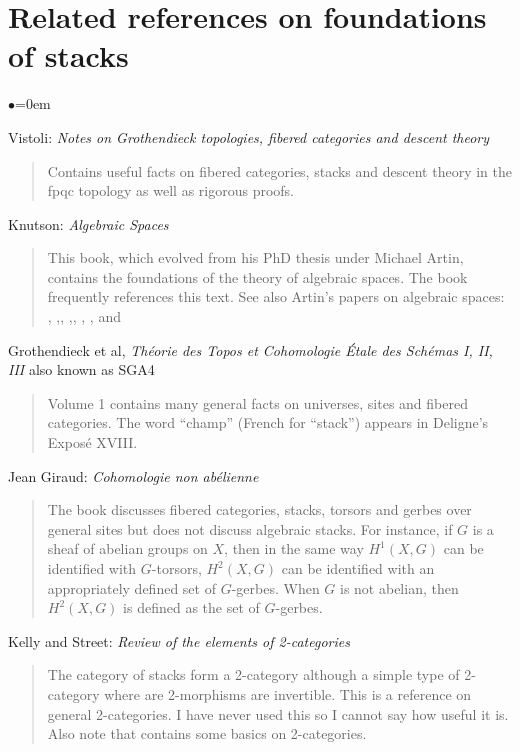 \section{Related references on foundations of stacks}
\label{section-related}


\begin{list}{$\bullet$}{\leftmargin=0em}
\item
Vistoli:
\emph{Notes on Grothendieck topologies, fibered categories and descent theory}
\cite{vistoli_fga}
\begin{quote}
Contains useful facts on fibered categories, stacks and descent theory in the 
fpqc topology as well as rigorous proofs.
\end{quote}
\smallskip
\item{} Knutson: \emph{Algebraic Spaces} \cite{knutson}
\begin{quote}
This book, which evolved from his PhD thesis under Michael Artin, 
contains the foundations of the theory of algebraic spaces. The book 
\cite{lmb} frequently references this text. See also Artin's papers on 
algebraic spaces: \cite{artin_approximation}, 
\cite{artin_algebraizationI},\cite{artin_implicit}, 
\cite{artin_algebraizationII},\cite{artin_construction}, 
\cite{artin_algebraic_spaces}, \cite{artin_theorems}, and \cite{artin_versal}
\end{quote}
\smallskip
\item Grothendieck et al, \emph{Th\'eorie des Topos et Cohomologie \'Etale des 
Sch\'emas I, II, III} also known as SGA4 \cite{SGA4} 
\begin{quote}
Volume 1 contains many general facts on universes, sites and fibered 
categories. The word ``champ'' (French for ``stack'') appears in 
Deligne's Expos\'e XVIII.
\end{quote}
\smallskip
\item{} Jean Giraud: \emph{Cohomologie non ab\'elienne} \cite{giraud}
\begin{quote}
The book discusses fibered categories, stacks, torsors and gerbes over general 
sites but does not discuss algebraic stacks. For instance, if $G$ is a sheaf 
of abelian groups on $X$, then in the same way $H^1(X,G)$ can be identified 
with $G$-torsors, $H^2(X,G)$ can be identified with an appropriately defined 
set of $G$-gerbes. When $G$ is not abelian, then $H^2(X,G)$ is defined as the 
set of $G$-gerbes.
\end{quote}
\smallskip
\item Kelly and Street: \emph{Review of the elements of 2-categories} 
\cite{kelly-street}
\begin{quote}
The category of stacks form a 2-category although a simple type of 2-category 
where are 2-morphisms are invertible. This is a reference on general 
2-categories. I have never used this so I cannot say how useful it is. Also 
note that \cite{stacks-project} contains some basics on 2-categories.
\end{quote}
\end{list}




